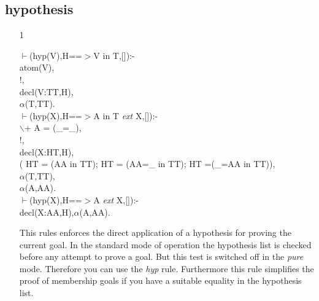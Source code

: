 \documentclass[11pt]{report}
\begin{document}
 \subsection{hypothesis}
 \begin{enumerate}
 \item[1]
\begin{sf}\begin{tabbing}
$\vdash$(hyp(V),H==$>$V in T,[]):-\\[-0.15ex]
\hspace{2em}atom(V),\\[-0.15ex]
\hspace{2em}!,\\[-0.15ex]
\hspace{2em}decl(V:TT,H),\\[-0.15ex]
\hspace{2em}$\alpha$(T,TT).\\[-0.15ex]
$\vdash$(hyp(X),H==$>$A in T \mbox{\it ext} X,[]):-\\[-0.15ex]
\hspace{2em}$\backslash$+ A = (\_\hspace{0.1em}=\_\hspace{0.1em}),\\[-0.15ex]
\hspace{2em}!,\\[-0.15ex]
\hspace{2em}decl(X:HT,H),\\[-0.15ex]
\hspace{2em}( HT = (AA in TT); HT = (AA=\_\hspace{0.1em} in TT); HT =(\_\hspace{0.1em}=AA in TT)),\\[-0.15ex]
\hspace{2em}$\alpha$(T,TT),\\[-0.15ex]
\hspace{2em}$\alpha$(A,AA).\\[-0.15ex]
$\vdash$(hyp(X),H==$>$A \mbox{\it ext} X,[]):-\\[-0.15ex]
\hspace{1em}decl(X:AA,H),$\alpha$(A,AA).\\[-0.7ex]

\end{tabbing}\end{sf}

 This rules enforces the direct application of a hypothesis
 for proving the current goal. In the standard mode of operation
 the hypothesis list is checked before any attempt to prove 
 a goal. But this test is switched off in the \emph{pure} mode.
 Therefore you can use the \emph{hyp} rule.
 Furthermore this rule simplifies the proof of membership
 goals if you have a suitable equality in the hypothesis list.
 \end{enumerate}
  
\end{document}
